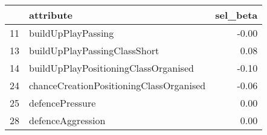 \begin{table}[ht]
\centering
\begin{tabular}{rlr}
  \hline
 & attribute & sel\_beta \\ 
  \hline
11 & buildUpPlayPassing & -0.00 \\ 
  13 & buildUpPlayPassingClassShort & 0.08 \\ 
  14 & buildUpPlayPositioningClassOrganised & -0.10 \\ 
  24 & chanceCreationPositioningClassOrganised & -0.06 \\ 
  25 & defencePressure & 0.00 \\ 
  28 & defenceAggression & 0.00 \\ 
   \hline
\end{tabular}
\end{table}
